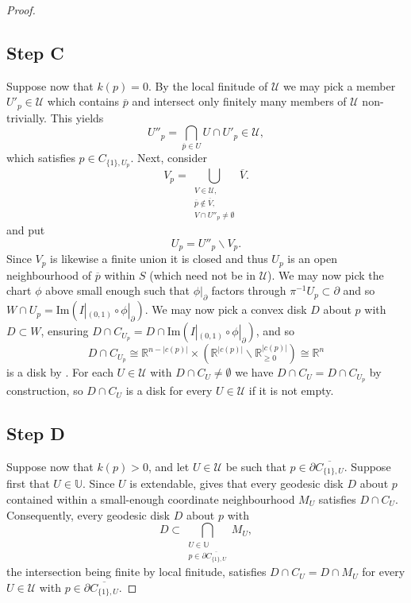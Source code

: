 \documentclass[11pt]{amsart}
\newcommand{\mcal}[1]{\mathcal{#1}}
\newcommand{\mrm}[1]{\mathrm{#1}}
\newcommand{\mbb}[1]{\mathbb{#1}}
\newcommand{\R}{\mbb{R}}
\numberwithin{equation}{section}
\theoremstyle{definition}
\theoremstyle{remark}
\theoremstyle{plain}
\begin{document}
\begin{proof}
    \subsection*{Step C} Suppose now that $k(p)=0$. By the local finitude of $\mcal{U}$ we may pick a member $U'_p\in\mcal{U}$ which contains $\overline{p}$ and intersect only finitely many members of $\mcal{U}$ non-trivially. This yields
    \[
        U''_p=\bigcap_{\overline{p}\in U}U\cap U'_p\in \mcal{U},
    \]
    which satisfies $p\in C_{\{1\},U_p}$. Next, consider
    \[
        V_p=\bigcup_{\substack{V\in\mcal{U},\\\overline{p}\notin \overline{V},\\ V\cap U''_p\neq\emptyset}} \overline{V}.
    \]
    and put 
    \[
        U_p=U''_p\smallsetminus V_p.
    \]
    Since $V_p$ is likewise a finite union it is closed and thus $U_p$ is an open neighbourhood of $\overline{p}$ within $S$ (which need not be in $\mcal{U}$). We may now pick the chart $\phi$ above small enough such that $\phi|_{\partial}$ factors through $\pi^{-1}U_{p}\subset\partial$ and so $W\cap U_{p}=\mrm{Im}(I|_{(0,1)}\circ\phi|_{\partial})$. We may now pick a convex disk $D$ about $p$ with $D\subset W$, ensuring $D\cap C_{U_{p}}=D\cap\mrm{Im}(I|_{(0,1)}\circ\phi|_{\partial})$, and so 
    \[
        D\cap C_{U_{p}}\cong\R^{n-|c(p)|}\times(\R^{|c(p)|}\smallsetminus\R_{\geq0}^{|c(p)|})\cong\R^n
    \]
    is a disk by . For each $U\in\mcal{U}$ with $D\cap C_U\neq\emptyset$ we have $D\cap C_U=D\cap C_{U_p}$ by construction, so $D\cap C_U$ is a disk for every $U\in\mcal{U}$ if it is not empty.

    \subsection*{Step D} Suppose now that $k(p)>0$, and let $U\in\mcal{U}$ be such that $p\in\partial\overline{C_{\{1\},U}}$. Suppose first that $U\in\mbb{U}$. Since $U$ is extendable,  gives that every geodesic disk $D$ about $p$ contained within a small-enough coordinate neighbourhood $M_U$ satisfies $D\cap C_U$. Consequently, every geodesic disk $D$ about $p$ with 
    \[
        D\subset\bigcap_{\substack{U\in\mbb{U}\\ p\in\partial\overline{C_{\{1\},U}}}} M_U,
    \]
    the intersection being finite by local finitude, satisfies $D\cap C_U=D\cap M_U$ for every $U\in\mcal{U}$ with $p\in\partial\overline{C_{\{1\},U}}$.
\end{proof}
\end{document}
